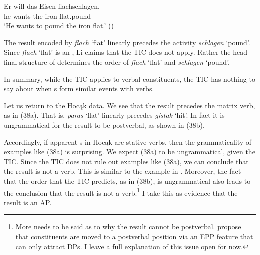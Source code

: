 \documentclass[output=paper]{LSP/langsci}
\begin{document}
\begin{exe}
\ex\label{ex:rosen:37}
 \gll Er will das Eisen flachschlagen.\\
he wants the iron flat.pound\\
\glt `He wants to pound the iron flat.' (\citealt[501 (41)]{Li1993})

\end{exe}

The result encoded by \textit{flach} `flat' linearly precedes the activity \textit{schlagen} `pound'. Since \textit{flach} `flat' is an , Li claims that the TIC does not apply. Rather the head-final structure of  determines the order of \textit{flach} `flat' and \textit{schlagen} `pound'. 

In summary, while the TIC applies to verbal constituents, the TIC has nothing to say about when s form similar events with verbs.

Let us return to the Hocąk data. We see that the result precedes the matrix verb, as in (38a). That is, \textit{paras} `flat' linearly precedes \textit{gistak} `hit'. In fact it is ungrammatical for the result to be postverbal, as shown in (38b).

\begin{exe}
\ex\label{ex:rosen:38}
\begin{xlist}



\end{xlist}
\end{exe}

 
Accordingly, if apparent s in Hocąk are stative verbs, then the grammaticality of examples like (38a) is surprising. We expect (38a) to be ungrammatical, given the TIC. Since the TIC does not rule out examples like (38a), we can conclude that the result is not a verb. This is similar to the  example in . Moreover, the fact that the order that the TIC predicts, as in (38b), is ungrammatical also leads to the conclusion that the result is not a verb.\footnote{More needs to be said as to why the result cannot be postverbal. \citet{JohnsonRosen2014} propose that constituents are moved to a postverbal position via an EPP feature that can only attract DPs. I leave a full explanation of this issue open for now.} I take this as evidence that the result is an AP.
 
\end{document}
